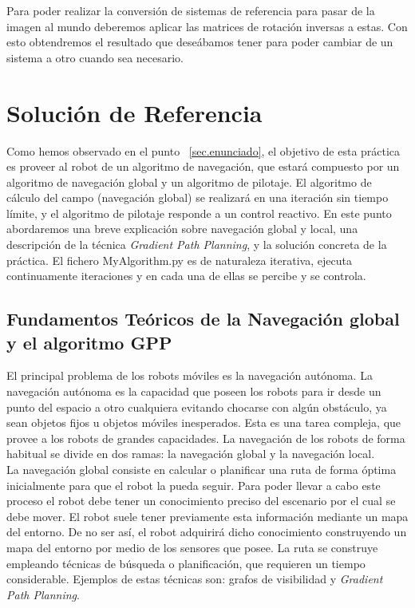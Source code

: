 Para poder realizar la conversión de sistemas de referencia para pasar de la imagen al mundo deberemos aplicar las matrices de rotación inversas a estas. Con esto obtendremos el resultado que deseábamos tener para poder cambiar de un sistema a otro cuando sea necesario.

\section{Solución de Referencia}\label{sec.solucion}
Como hemos observado en el punto ~\ref{sec.enunciado}, el objetivo de esta práctica es proveer al robot de un algoritmo de navegación, que estará compuesto por un algoritmo de navegación global y un algoritmo de pilotaje. El algoritmo de cálculo del campo (navegación global) se realizará en una iteración sin tiempo límite, y el algoritmo de pilotaje responde a un control reactivo. En este punto abordaremos una breve explicación sobre navegación global y local, una descripción de la técnica \textit{Gradient Path Planning}, y la solución concreta de la práctica. El fichero MyAlgorithm.py es de naturaleza iterativa, ejecuta continuamente iteraciones y en cada una de ellas se percibe y se controla.

\subsection{Fundamentos Teóricos de la Navegación global y el algoritmo GPP}
El principal problema de los robots móviles es la navegación autónoma. La navegación autónoma es la capacidad que poseen los robots para ir desde un punto del espacio a otro cualquiera evitando chocarse con algún obstáculo, ya sean objetos fijos u objetos móviles inesperados. Esta es una tarea compleja, que provee a los robots de grandes capacidades. La navegación de los robots de forma habitual se divide en dos ramas: la navegación global y la navegación local.\\

La navegación global consiste en calcular o planificar una ruta de forma óptima inicialmente para que el robot la pueda seguir. Para poder llevar a cabo este proceso el robot debe tener un conocimiento preciso del escenario por el cual se debe mover. El robot suele tener previamente esta información mediante un mapa del entorno. De no ser así, el robot adquirirá dicho conocimiento construyendo un mapa del entorno por medio de los sensores que posee. La ruta se construye empleando técnicas de búsqueda o planificación, que requieren un tiempo considerable. Ejemplos de estas técnicas son: grafos de visibilidad y \textit{Gradient Path Planning}.\\

